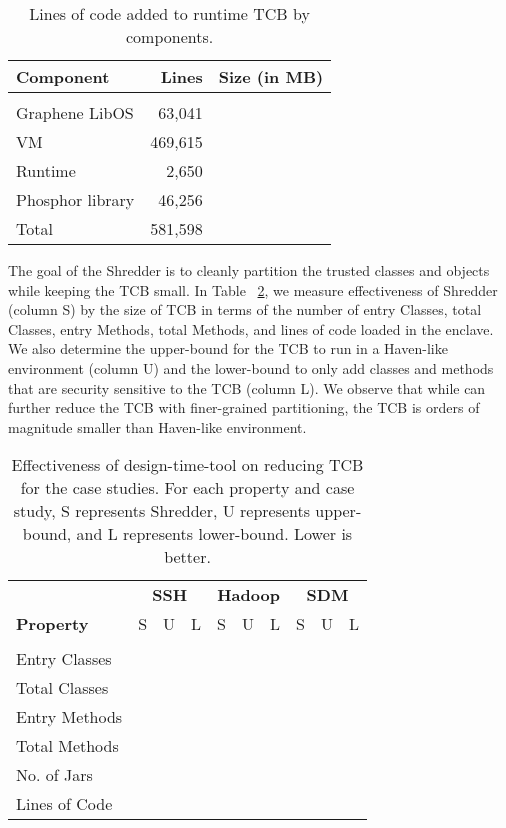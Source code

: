\begin{table}[t!b!]
	\footnotesize
	\centering
	\begin{tabular}{lrr}
		\hline
		{\bf Component} & {\bf Lines} & {\bf Size (in MB)}\\
		\hline\\
		Graphene LibOS & 63,041 &  \\
		\java{} VM & 469,615 &  \\
		\systemname{} Runtime & 2,650 &  \\
		Phosphor library & 46,256 &  \\
		\hline
		Total & 581,598 &  \\
		\hline
	\end{tabular}
	\caption{Lines of code added to runtime TCB by \systemname{} components.}
	\label{tab:common-tcb}
\end{table}

The goal of the \systemname{} Shredder is to cleanly partition the trusted classes and objects while keeping the TCB small. 
In Table ~\ref{tab:case-tcb}, we measure effectiveness of Shredder (column S) by the size of TCB in terms of the number of entry Classes, total Classes, entry Methods, total Methods, and lines of code loaded in the enclave. 
We also determine the upper-bound for the TCB to run in a Haven-like environment (column U) and the lower-bound to only add classes and methods that are security sensitive to the TCB (column L). We observe that while \systemname{} can further reduce the TCB with finer-grained partitioning, the TCB is orders of magnitude smaller than Haven-like environment.

\begin{table}[t!b!]
	\footnotesize
	\centering
	\tabcolsep=0.09cm
	\begin{tabular}{lrrrrrrrrr}
		\hline
		& \multicolumn{3}{c}{{\bf SSH}} & \multicolumn{3}{c}{{\bf Hadoop}} & \multicolumn{3}{c}{{\bf SDM}}\\
		
		{\bf Property} & {S} & {U} & {L} 
		& {S} & {U} & {L} 
		& {S} & {U} & {L}\\
		\hline\\
		Entry Classes &  &  &  &  &  &  &  &  &  \\
		Total Classes &  &  &  &  &  &  &  &  &  \\
		Entry Methods &  &  &  &  &  &  &  &  &  \\
		Total Methods &  &  &  &  &  &  &  &  &  \\
		No. of Jars &  &  &  &  &  &  &  &  &  \\
		Lines of Code &  &  &  &  &  &  &  &  &  \\
		\hline
	\end{tabular}
	\caption{Effectiveness of \systemname{} design-time-tool on reducing TCB for the case studies. For each property and case study, S represents Shredder, U represents upper-bound, and L represents lower-bound. Lower is better.}
	\label{tab:case-tcb}
\end{table}
